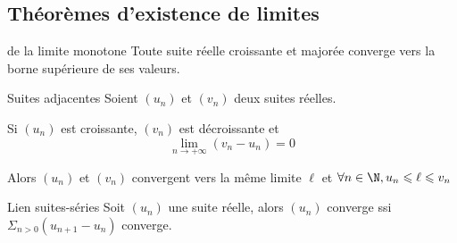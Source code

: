 \subsection{Théorèmes d'existence de limites}

\begin{theorement}{de la limite monotone}{}
    Toute suite réelle croissante et majorée converge vers la borne supérieure de ses valeurs. 
    
\end{theorement}

\begin{theorement}{Suites adjacentes}{}
    Soient $(u_n)$ et $(v_n)$ deux suites réelles. 

    Si $(u_n)$ est croissante, $(v_n)$ est décroissante et
    $$\lim_{n \to +\infty} (v_n - u_n) = 0$$

    Alors $(u_n)$ et $(v_n)$ convergent vers la même limite $\ell$ 
    et $\forall n \in \N, u_n \leqslant \ell \leqslant v_n$
\end{theorement}

\begin{theorement}{Lien suites-séries}{}
    Soit $(u_n)$ une suite réelle, alors $(u_n)$ converge ssi $\Sigma_{n>0} (u_{n+1} - u_n)$ converge.
\end{theorement}

